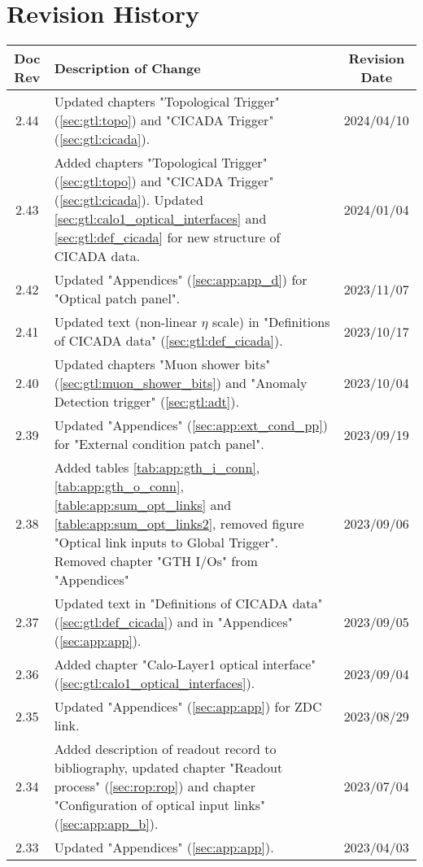 \section*{Revision History}
\label{sec:revision_history}

\begin{longtable}{|c|p{}|c|}
\hline
Doc Rev & Description of Change & Revision Date\\
\hline
\hline
\endhead
2.44 & Updated chapters "Topological Trigger" (\ref{sec:gtl:topo}) and "CICADA Trigger" (\ref{sec:gtl:cicada}). & 2024/04/10\\
2.43 & Added chapters "Topological Trigger" (\ref{sec:gtl:topo}) and "CICADA Trigger" (\ref{sec:gtl:cicada}). Updated \ref{sec:gtl:calo1_optical_interfaces} and \ref{sec:gtl:def_cicada} for new structure of CICADA data. & 2024/01/04\\
2.42 & Updated "Appendices" (\ref{sec:app:app_d}) for "Optical patch panel". & 2023/11/07\\
2.41 & Updated text (non-linear $\eta$ scale) in "Definitions of CICADA data" (\ref{sec:gtl:def_cicada}). & 2023/10/17\\
2.40 & Updated chapters "Muon shower bits" (\ref{sec:gtl:muon_shower_bits}) and "Anomaly Detection trigger" (\ref{sec:gtl:adt}). & 2023/10/04\\
2.39 & Updated "Appendices" (\ref{sec:app:ext_cond_pp}) for "External condition patch panel". & 2023/09/19\\
2.38 & Added tables \ref{tab:app:gth_i_conn}, \ref{tab:app:gth_o_conn}, \ref{table:app:sum_opt_links} and \ref{table:app:sum_opt_links2}, removed figure "Optical link inputs to Global Trigger". Removed chapter "GTH I/Os" from "Appendices" & 2023/09/06\\
2.37 & Updated text in "Definitions of CICADA data" (\ref{sec:gtl:def_cicada}) and in "Appendices" (\ref{sec:app:app}). & 2023/09/05\\
2.36 & Added chapter "Calo-Layer1 optical interface" (\ref{sec:gtl:calo1_optical_interfaces}). & 2023/09/04\\
2.35 & Updated "Appendices" (\ref{sec:app:app}) for ZDC link. & 2023/08/29\\
2.34 & Added description of readout record to bibliography, updated chapter "Readout process" (\ref{sec:rop:rop}) and chapter "Configuration of optical input links" (\ref{sec:app:app_b}). & 2023/07/04\\
2.33 & Updated "Appendices" (\ref{sec:app:app}). & 2023/04/03\\

\end{longtable}

